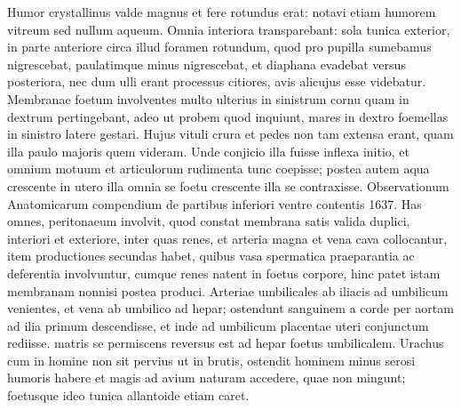 Humor crystallinus valde magnus et fere rotundus erat: notavi etiam humorem vitreum sed nullum aqueum.
Omnia 
interiora 
transparebant: sola tunica exterior, in parte anteriore circa illud foramen rotundum, quod pro pupilla sumebamus nigrescebat, paulatimque minus nigrescebat, et diaphana evadebat versus posteriora, nec dum ulli erant processus citiores, avis alicujus
 esse videbatur.
\pend%
\pstart%
Membranae foetum involventes multo ulterius in sinistrum cornu quam in dextrum pertingebant,
adeo ut probem quod inquiunt, mares in dextro foemellas in sinistro latere gestari.
\pend%
\newpage
\pstart%
Hujus vituli crura et pedes non tam extensa erant, quam illa paulo majoris quem  videram.
Unde conjicio illa fuisse inflexa initio, et omnium motuum et articulorum rudimenta tunc coepisse; postea autem aqua crescente in utero illa omnia se
foetu crescente illa se contraxisse.
\pend%
\vspace*{1.0em}%
\pstart%
\noindent%
Observationum Anatomicarum compendium de partibus %
inferiori ventre contentis 1637.
\pend%
\pstart%
Has omnes, peritonaeum involvit, quod constat membrana satis valida duplici, interiori et exteriore, inter quas renes, et arteria magna et vena cava collocantur, item productiones secundas habet, quibus vasa spermatica praeparantia ac deferentia involvuntur, cumque renes natent in foetus corpore, hinc patet istam membranam nonnisi postea produci.
\pend%
\pstart%
Arteriae umbilicales ab iliacis ad umbilicum venientes, et vena ab umbilico ad hepar;
ostendunt sanguinem a corde per aortam ad ilia primum descendisse, et inde ad umbilicum placentae uteri conjunctum rediisse.
matris se permiscens reversus est ad hepar foetus
 umbilicalem.
Urachus cum in homine non sit pervius ut in brutis, ostendit hominem minus serosi humoris habere et magis ad avium naturam accedere, quae non mingunt; foetusque ideo tunica allantoide etiam caret.

